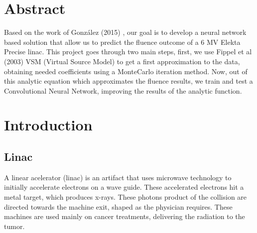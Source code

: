\documentclass[openany]{article}
\begin{document}
\clearpage\thispagestyle{empty}\null\newpage %
	


\newpage
\thispagestyle{plain}
{
\hypersetup{hidelinks}
\tableofcontents
}

\newpage 
\thispagestyle{empty}


\thispagestyle{plain}

\section{Abstract}

Based on the work of González (2015) \cite{Gonzalez2015}, our goal is to develop a neural network based solution that allow us to predict the fluence outcome of a 6 MV Elekta Precise linac. This project goes through two main steps, first, we use Fippel et al (2003) \cite{Fippel} VSM (Virtual Source Model) to get a first approximation to the data, obtaining needed coefficients using a MonteCarlo iteration method. Now, out of this analytic equation which approximates the fluence results, we train and test a Convolutional Neural Network, improving the results of the analytic function.

    \vspace{2cm}
    





\newpage

\section{Introduction} \label{sec: introduction}

\subsection{Linac}


A linear acelerator (linac) is an artifact that uses microwave technology to initially accelerate electrons on a wave guide. These accelerated electrons hit a metal target, which produces x-rays. These photons product of the collision are directed towards the machine exit, shaped as the physician requires. These machines are used mainly on cancer treatments, delivering the radiation to the tumor.
\end{document}

